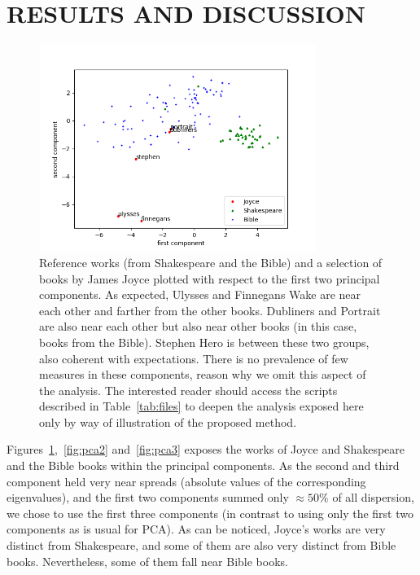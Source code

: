 \documentclass[12pt,fleqn]{article}
\begin{document}
\section{RESULTS AND DISCUSSION}\label{sec:res}

\begin{figure}[!htbp] %
\vspace{-2pt}
\begin{center}
\includegraphics[height=6.7cm,width=9cm]{figs/pca}%
    \caption{Reference works (from Shakespeare and the Bible) and a selection of books by James Joyce plotted with respect to the first two principal components.
    As expected, Ulysses and Finnegans Wake are near each other and farther from the other books. Dubliners and Portrait are also near each other but also near other books (in this case, books from the Bible).
    Stephen Hero is between these two groups, also coherent with expectations.
    There is no prevalence of few measures in these components, reason why we omit this aspect of the analysis.
    The interested reader should access the scripts described in Table~\ref{tab:files} to deepen the analysis exposed here only by way of illustration of the proposed method.}
\label{fig:pca1}%
\end{center}
\end{figure}

Figures~\ref{fig:pca1},~\ref{fig:pca2} and~\ref{fig:pca3} exposes the works of Joyce and
Shakespeare and the Bible books within the principal components.
As the second and third component held very near spreads (absolute values of the corresponding eigenvalues),
and the first two components summed only $\approx 50\%$ of all dispersion,
we chose to use the first three components (in contrast to using only the first two components as is usual for PCA).
As can be noticed, Joyce's works are very distinct from Shakespeare,
and some of them are also very distinct from Bible books.
Nevertheless, some of them fall near Bible books.
\end{document}

